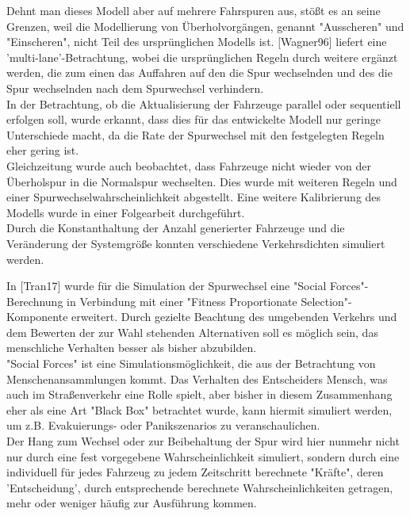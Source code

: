 Dehnt man dieses Modell aber auf mehrere Fahrspuren aus, stößt es an seine Grenzen, weil die Modellierung von Überholvorgängen, genannt "Ausscheren" und "Einscheren", nicht Teil des ursprünglichen Modells ist. [Wagner96] liefert eine 'multi-lane'-Betrachtung, wobei die ursprünglichen Regeln durch weitere ergänzt werden, die zum einen das Auffahren auf den die Spur wechselnden und des die Spur wechselnden nach dem Spurwechsel verhindern. \\
In der Betrachtung, ob die Aktualisierung der Fahrzeuge parallel oder sequentiell erfolgen soll, wurde erkannt, dass dies für das entwickelte Modell nur geringe Unterschiede macht, da die Rate der Spurwechsel mit den festgelegten Regeln eher gering ist. \\
Gleichzeitung wurde auch beobachtet, dass Fahrzeuge nicht wieder von der Überholspur in die Normalspur wechselten. Dies wurde mit weiteren Regeln und einer Spurwechselwahrscheinlichkeit abgestellt. Eine weitere Kalibrierung des Modells wurde in einer Folgearbeit durchgeführt. \\
Durch die Konstanthaltung der Anzahl generierter Fahrzeuge und die Veränderung der Systemgröße konnten verschiedene Verkehrsdichten simuliert werden. 

In [Tran17] wurde für die Simulation der Spurwechsel eine "Social Forces"-Berechnung in Verbindung mit einer "Fitness Proportionate Selection"-Komponente erweitert. Durch gezielte Beachtung des umgebenden Verkehrs und dem Bewerten der zur Wahl stehenden Alternativen soll es möglich sein, das menschliche Verhalten besser als bisher abzubilden. \\
"Social Forces" ist eine Simulationsmöglichkeit, die aus der Betrachtung von Menschenansammlungen kommt. Das Verhalten des Entscheiders Mensch, was auch im Straßenverkehr eine Rolle spielt, aber bisher in diesem Zusammenhang eher als eine Art "Black Box" betrachtet wurde, kann hiermit simuliert werden, um z.B. Evakuierungs- oder Panikszenarios zu veranschaulichen.\\
Der Hang zum Wechsel oder zur Beibehaltung der Spur wird hier nunmehr nicht nur durch eine fest vorgegebene Wahrscheinlichkeit simuliert, sondern durch eine individuell für jedes Fahrzeug zu jedem Zeitschritt berechnete "Kräfte", deren 'Entscheidung', durch entsprechende berechnete Wahrscheinlichkeiten getragen, mehr oder weniger häufig zur Ausführung kommen. 